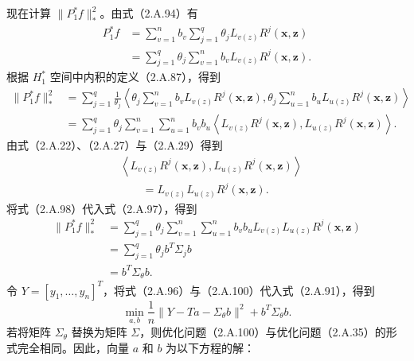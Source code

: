 现在计算 $\|P_1^*f\|_*^2$。由式（2.A.94）有
\begin{equation}
\begin{aligned}
P_1^*f&=\sum_{v=1}^nb_v\sum_{j=1}^q
 \theta_jL_{v(z)}R^j(\boldsymbol x,\boldsymbol z)\\
 &=\sum_{j=1}^q\theta_j\sum_{v=1}^nb_vL_{v(z)}R^j(\boldsymbol x,\boldsymbol z).
\end{aligned}\tag{2.A.97}
\end{equation}
根据 $H_1^*$ 空间中内积的定义（2.A.87），得到
\begin{equation}
\begin{aligned}
\|P_1^*f\|_*^2
 &=\sum_{j=1}^q\frac1{\theta_j}
 \left\langle\theta_j\sum_{v=1}^nb_vL_{v(z)}R^j(\boldsymbol x,\boldsymbol z),
 \theta_j\sum_{u=1}^nb_uL_{u(z)}R^j(\boldsymbol x,\boldsymbol z)\right\rangle\\
 &=\sum_{j=1}^q\theta_j\sum_{v=1}^n\sum_{u=1}^nb_vb_u
 \left\langle L_{v(z)}R^j(\boldsymbol x,\boldsymbol z),
             L_{u(z)}R^j(\boldsymbol x,\boldsymbol z)\right\rangle.
\end{aligned}\tag{2.A.98}
\end{equation}
由式（2.A.22）、（2.A.27）与（2.A.29）得到
\begin{equation}
\begin{aligned}
&\left\langle L_{v(z)}R^j(\boldsymbol x,\boldsymbol z),
              L_{u(z)}R^j(\boldsymbol x,\boldsymbol z)\right\rangle\\
&\qquad=L_{v(z)}L_{u(z)}R^j(\boldsymbol x,\boldsymbol z).
\end{aligned}\tag{2.A.99}
\end{equation}
将式（2.A.98）代入式（2.A.97），得到
\begin{equation}
\begin{aligned}
\|P_1^*f\|_*^2
 &=\sum_{j=1}^q\theta_j\sum_{v=1}^n\sum_{u=1}^nb_vb_u
 L_{v(z)}L_{u(z)}R^j(\boldsymbol x,\boldsymbol z)\\
 &=\sum_{j=1}^q\theta_jb^T\Sigma_jb\\
 &=b^T\Sigma_\theta b.
\end{aligned}\tag{2.A.100}
\end{equation}
令 $Y=[y_1,\ldots,y_n]^T$，将式（2.A.96）与（2.A.100）代入式（2.A.91），得到
\begin{equation}
\min_{a,b}\frac1n\|Y-Ta-\Sigma_\theta b\|^2+b^T\Sigma_\theta b.\tag{2.A.101}
\end{equation}
若将矩阵 $\Sigma_\theta$ 替换为矩阵 $\Sigma$，则优化问题（2.A.100）与优化问题（2.A.35）的形式完全相同。因此，向量 $a$ 和 $b$ 为以下方程的解：
